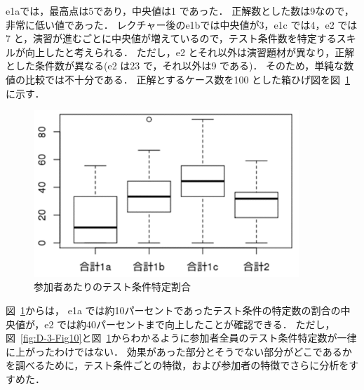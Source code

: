 e1aでは，最高点は5であり，中央値は1 であった．
正解数とした数は9なので，非常に低い値であった．
レクチャー後のe1bでは中央値が3，e1c では4，e2 では7 と，演習が進むごとに中央値が増えているので，テスト条件数を特定するスキルが向上したと考えられる．
ただし，e2 とそれ以外は演習題材が異なり，正解とした条件数が異なる(e2 は23 で，それ以外は9 である)．
そのため，単純な数値の比較では不十分である．
正解とするケース数を100 とした箱ひげ図を図~\ref{fig:D-3-Fig11}に示す．
\begin{figure}[htbp]
  \begin{center}
  \includegraphics[width=10cm]{./image/D-3-Fig11.png}
  \caption{参加者あたりのテスト条件特定割合}
  \label{fig:D-3-Fig11}
  \end{center}
   \end{figure}

図~\ref{fig:D-3-Fig11}からは， e1a では約10パーセントであったテスト条件の特定数の割合の中央値が，e2 では約40パーセントまで向上したことが確認できる．
ただし，図~\ref{fig:D-3-Fig10}と図~\ref{fig:D-3-Fig11}からわかるように参加者全員のテスト条件特定数が一律に上がったわけではない．
効果があった部分とそうでない部分がどこであるかを調べるために，テスト条件ごとの特徴，および参加者の特徴でさらに分析をすすめた．

